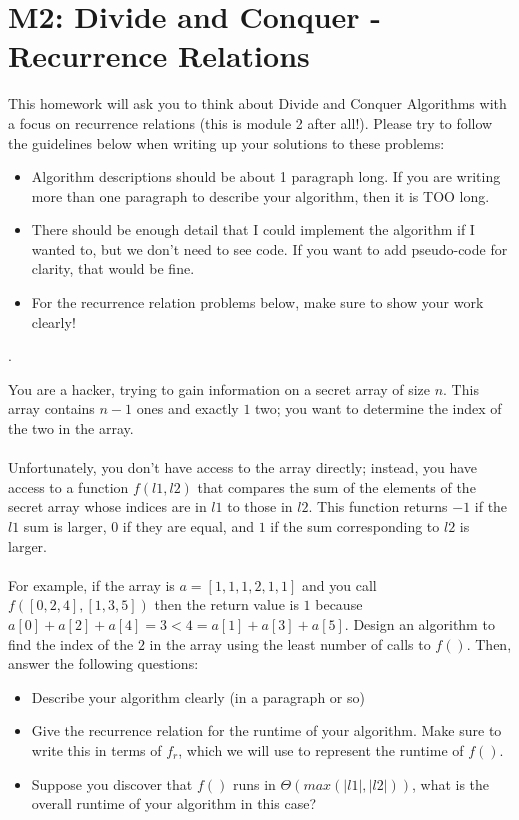 \documentclass[12pt]{article}
\def\homework{M2: Divide and Conquer - Recurrence Relations}
\newcounter{quesnum}
\newcommand{\question}[2][??]{
\begin{list}{\labelitemi}{\leftmargin=2em}
\item [\arabic{quesnum}.] {} {#2}
\end{list}
\addtocounter{quesnum}{1}
}
\begin{document}
\section*{\homework}

This homework will ask you to think about Divide and Conquer Algorithms with a focus on recurrence relations (this is module 2 after all!). Please try to follow the guidelines below when writing up your solutions to these problems:

\begin{itemize}
	\item Algorithm descriptions should be about 1 paragraph long. If you are writing more than one paragraph to describe your algorithm, then it is TOO long. 
	\item There should be enough detail that I could implement the algorithm if I wanted to, but we don't need to see code. If you want to add pseudo-code for clarity, that would be fine.
	\item For the recurrence relation problems below, make sure to show your work clearly!
\end{itemize}

\vspace{14pt}

\question[3]{
You are a hacker, trying to gain information on a secret array of size $n$. This array contains $n-1$ ones and exactly $1$ two; you want to determine the index of the two in the array.\\
\\
Unfortunately, you don't have access to the array directly; instead, you have access to a function $f(l1, l2)$ that compares the sum of the elements of the secret array whose indices are in $l1$ to those in $l2$. This function returns $-1$ if the $l1$ sum is larger, $0$ if they are equal, and $1$ if the sum corresponding to $l2$ is larger.\\
\\
For example, if the array is $a=[1,1,1,2,1,1]$ and you call $f([0,2,4],[1,3,5])$ then the return value is $1$ because $a[0]+a[2]+a[4]=3<4=a[1]+a[3]+a[5]$. Design an algorithm to find the index of the $2$ in the array using the least number of calls to $f()$. Then, answer the following questions:

\begin{itemize}
	\item Describe your algorithm clearly (in a paragraph or so)
	\item Give the recurrence relation for the runtime of your algorithm. Make sure to write this in terms of $f_r$, which we will use to represent the runtime of $f()$.
	\item Suppose you discover that $f()$ runs in $\Theta(max(|l1|,|l2|))$, what is the overall runtime of your algorithm in this case? 
\end{itemize}
}
\end{document}
